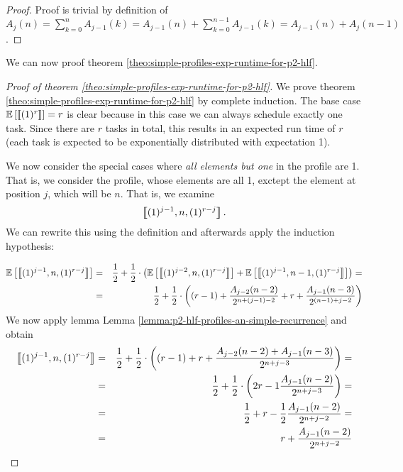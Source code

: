 \begin{proof}
  Proof is trivial by definition of $A_{j}(n) = \sum_{k=0}^{n} A_{j-1}(k) = A_{j-1}(n) + \sum_{k=0}^{n-1} A_{j-1}(k) = A_{j-1}(n) + A_{j}(n-1)$.
\end{proof}

We can now proof theorem \ref{theo:simple-profiles-exp-runtime-for-p2-hlf}.

\begin{proof}[Proof of theorem \ref{theo:simple-profiles-exp-runtime-for-p2-hlf}]
  We prove theorem \ref{theo:simple-profiles-exp-runtime-for-p2-hlf} by complete induction. The base case $\mathbb{E}\left[ \left\llbracket (1)^{r} \right\rrbracket \right] = r$ is clear because in this case we can always schedule exactly one task. Since there are $r$ tasks in total, this results in an expected run time of $r$ (each task is expected to be exponentially distributed with expectation 1).

  We now consider the special cases where \emph{all elements but one} in the profile are 1. That is, we consider the profile, whose elements are all 1, exctept the element at position $j$, which will be $n$. That is, we examine
  \begin{equation*}
    \left\llbracket (1)^{j-1},n,(1)^{r-j} \right\rrbracket.
  \end{equation*}
  We can rewrite this using the definition and afterwards apply the induction hypothesis:

  \begin{eqnarray*}
    \mathbb{E}\left[ \left\llbracket (1)^{j-1},n,(1)^{r-j} \right\rrbracket \right]
    & = & 
    \frac{1}{2} + \frac{1}{2} \cdot 
    \left( 
      \mathbb{E}\left[ \left\llbracket (1)^{j-2},n,(1)^{r-j} \right\rrbracket \right] + 
      \mathbb{E}\left[ \left\llbracket (1)^{j-1},n-1,(1)^{r-j} \right\rrbracket \right]
    \right) = \\
    & = & 
    \frac{1}{2} + \frac{1}{2} \cdot 
    \left( 
      (r-1) + \frac{A_{j-2}(n-2)}{2^{n+(j-1)-2}} +
      r + \frac{A_{j-1}(n-3)}{2^{(n-1)+j-2}}
    \right)
  \end{eqnarray*}
  We now apply lemma Lemma \ref{lemma:p2-hlf-profiles-an-simple-recurrence} and obtain
  \begin{eqnarray*}
    \left\llbracket (1)^{j-1},n,(1)^{r-j} \right\rrbracket
    & = & 
    \frac{1}{2} + \frac{1}{2} \cdot 
    \left( 
      (r-1)+r + 
      \frac{A_{j-2}(n-2) + A_{j-1}(n-3)}{2^{n+j-3}}
    \right) = \\
    & = &
    \frac{1}{2} + \frac{1}{2} \cdot 
    \left( 
      2r - 1
      \frac{A_{j-1}(n-2)}{2^{n+j-3}}
    \right) = \\
    & = &
    \frac{1}{2} + 
    r - \frac{1}{2}
    \frac{A_{j-1}(n-2)}{2^{n+j-2}} = \\
    & = &
    r + \frac{A_{j-1}(n-2)}{2^{n+j-2}}
  \end{eqnarray*}


\end{proof}
